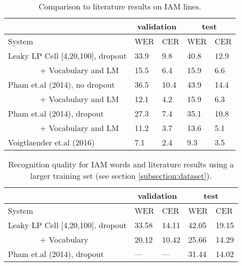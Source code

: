 \documentclass[conference]{IEEEtran}
\begin{document}
\begin{table}
\caption{Comparison to literature results on IAM lines.}
\centering
 \begin{tabular}{|l|l|l|l|l|}
 \hline
 & \multicolumn{2}{|c|}{validation} &  \multicolumn{2}{|c|}{test}\\
 \hline
 System & WER & CER & WER & CER \\
 \hline
 Leaky LP Cell [4,20,100], dropout  & 33.9 & 9.8& 40.8 & 12.9  \\
 \ \ \ \ \ \ \ \ + Vocabulary and LM  & 15.5 & 6.4 & 15.9 & 6.6 \\
 \hline 
 \hline 
 Pham et.al (2014), no dropout & 36.5 & 10.4 &  43.9 & 14.4 \\
 \ \ \ \ \ \ \ \ + Vocabulary and LM & 12.1 & 4.2 &  15.9 & 6.3 \\
 Pham et.al (2014), dropout & 27.3 & 7.4 &  35.1 & 10.8  \\
 \ \ \ \ \ \ \ \ +  Vocabulary and LM & 11.2 & 3.7 &  13.6 & 5.1  \\
 Voigtlaender et.al (2016) & 7.1 & 2.4 & 9.3 & 3.5  \\
 \hline
 \end{tabular}
 \label{fig:results_on_iam_comparison_to_literature}
\end{table}


\begin{table}
\caption{Recognition quality for IAM words and literature results using a larger training set (see section \ref{subsection:dataset}). }
\centering
 \begin{tabular}{|p{3.9cm}|l|l|l|l|}
 \hline
 & \multicolumn{2}{|c|}{validation} &  \multicolumn{2}{|c|}{test}\\
 \hline
 System & WER & CER & WER & CER \\
 \hline
 Leaky LP Cell [4,20,100], dropout  & 33.58 & 14.11 & 42.05 & 19.15  \\
 \ \ \ \ \ \ \ \ + Vocabulary  & 20.12 & 10.42 & 25.66 & 14.29 \\
 \hline 
 \hline 
 Pham et.al (2014), dropout &  --- & --- & 31.44 & 14.02  \\
 \hline
 \end{tabular}
 \label{fig:results_on_iam_words}
\end{table}
\end{document}
